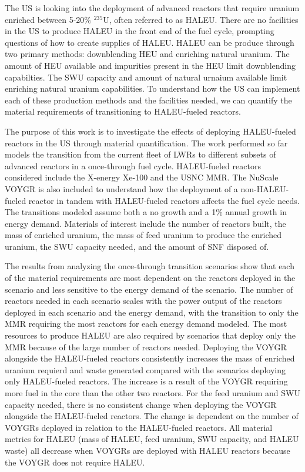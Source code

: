 The US is looking into the deployment of advanced reactors that 
require uranium enriched between 5-20\% $^{235}$U, often referred to 
as \gls{HALEU}. There are no facilities 
in the US to produce \gls{HALEU} in the front end of the fuel cycle, 
prompting questions of how to create supplies of \gls{HALEU}. 
\gls{HALEU} can be produce through two primary methods: downblending 
\gls{HEU} and enriching natural uranium. The amount of \gls{HEU} available 
and impurities present in the \gls{HEU} limit downblending capabilties.
The \gls{SWU} capacity and amount of natural urnaium available limit 
enriching natural uranium capabilities. To understand how the US can 
implement each of these production 
methods and the facilities needed, we can quantify the 
material requirements of transitioning to \gls{HALEU}-fueled 
reactors. 

The purpose of this work is to investigate the effects of deploying 
\gls{HALEU}-fueled reactors in the US through material quantification. 
The work performed so far models the transition from the
current fleet of \glspl{LWR} to different subsets of advanced reactors
in a once-through fuel cycle. 
\gls{HALEU}-fueled reactors considered include the X-energy Xe-100 and 
the \gls{USNC} \gls{MMR}. The NuScale VOYGR is also included to understand 
how the deployment of a non-\gls{HALEU}-fueled reactor in tandem with 
\gls{HALEU}-fueled reactors affects the fuel cycle needs. The 
transitions modeled assume both a no growth and a 1\% 
annual growth in energy demand. Materials of interest include the 
number of reactors built, the mass of enriched uranium, the mass 
of feed uranium to produce the enriched uranium, the \gls{SWU} 
capacity needed, and the amount of \gls{SNF} disposed of. 

The results from analyzing the once-through transition scenarios show 
that each of the material requirements are most dependent on the 
reactors deployed in the scenario and less sensitive to the energy 
demand of the scenario. The number of reactors needed in each scenario 
scales with the power output of the reactors deployed in each scenario 
and the energy demand, 
with the transition to only the \gls{MMR} requiring the most reactors for 
each energy demand modeled. The most resources to produce 
\gls{HALEU} are also required by scenarios that deploy only the \gls{MMR}
because of the large number of reactors needed. Deploying the VOYGR 
alongside the \gls{HALEU}-fueled reactors consistently increases the 
mass of enriched uranium requierd and waste generated compared with the 
scenarios deploying 
only \gls{HALEU}-fueled reactors. The increase is a result of the 
VOYGR requiring more fuel in the core than the other two reactors. 
For the feed uranium and \gls{SWU} capacity needed, there is no consistent 
change when deploying the VOYGR alongside the \gls{HALEU}-fueled reactors. 
The change is dependent on the number of VOYGRs deployed in relation to 
the \gls{HALEU}-fueled reactors. All material metrics for \gls{HALEU} 
(mass of \gls{HALEU}, feed uranium, \gls{SWU} capacity, and \gls{HALEU} 
waste) all decrease when VOYGRs are deployed with \gls{HALEU} reactors
because the VOYGR does not require \gls{HALEU}.

